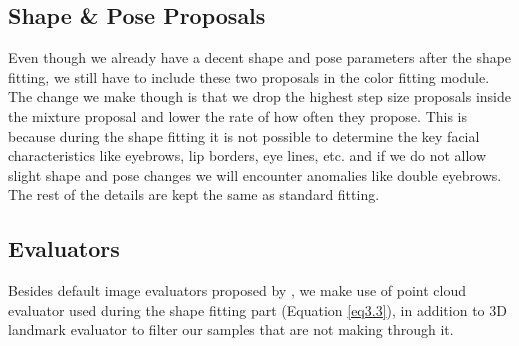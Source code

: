 \subsection*{Shape \& Pose Proposals}
Even though we already have a decent shape and pose parameters after the shape fitting, we still have to include these two proposals in the color fitting module. The change we make though is that we drop the highest step size proposals inside the mixture proposal and lower the rate of how often they propose. This is because during the shape fitting it is not possible to determine the key facial characteristics like eyebrows, lip borders, eye lines, etc. and if we do not allow slight shape and pose changes we will encounter anomalies like double eyebrows. The rest of the details are kept the same as standard fitting. 

\subsection*{Evaluators}
Besides default image evaluators proposed by \cite{Schoenborn2017}, we make use of point cloud evaluator used during the shape fitting part (Equation \ref{eq3.3}), in addition to 3D landmark evaluator to filter our samples that are not making through it.